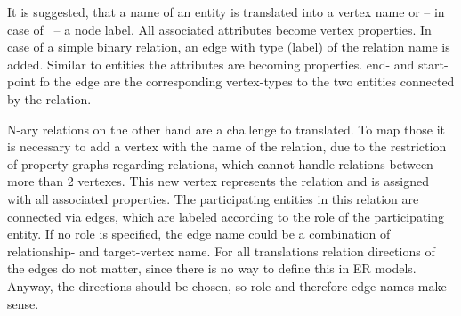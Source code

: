 It is suggested, that a name of an entity is translated into a vertex name or -- in case of \neoj\ -- a node label. All associated attributes become vertex properties.
In case of a simple binary relation, an edge with type (\neoj label) of the relation name is added. Similar to entities the attributes are becoming properties. end- and start-point fo the edge are the corresponding vertex-types to the two entities connected by the relation.

N-ary relations on the other hand are a challenge to translated. To map those it is necessary to add a vertex with the name of the relation, due to the restriction of property graphs regarding relations, which cannot handle relations between more than 2 vertexes.
This new vertex represents the relation and is assigned with all associated properties. The participating entities in this relation are connected via edges, which are labeled according to the role of the participating entity. If no role is specified, the edge name could be a combination of relationship- and target-vertex name.
For all translations relation directions of the edges do not matter, since there is no way to define this in ER models. Anyway, the directions should be chosen, so role and therefore edge names make sense.

